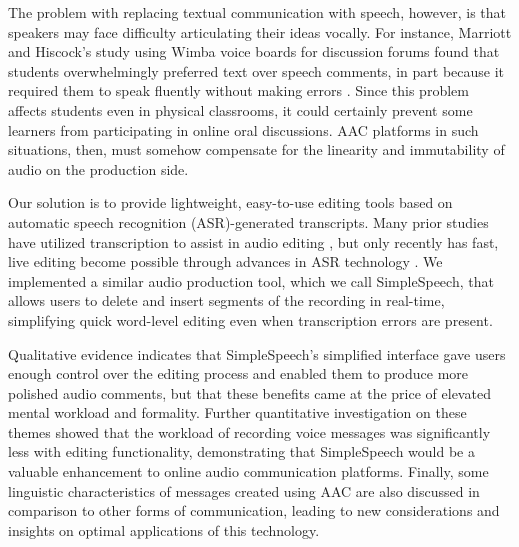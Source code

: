 The problem with replacing textual communication with speech, however, is that speakers may face difficulty articulating their ideas vocally.
For instance, Marriott and Hiscock's study using Wimba voice boards for discussion forums found that students overwhelmingly preferred text over speech comments, in part because it required them to speak fluently without making errors \cite{wimba}.
Since this problem affects students even in physical classrooms, it could certainly prevent some learners from participating in online oral discussions.
AAC platforms in such situations, then, must somehow compensate for the linearity and immutability of audio on the production side.

Our solution is to provide lightweight, easy-to-use editing tools based on automatic speech recognition (ASR)-generated transcripts.
Many prior studies have utilized transcription to assist in audio editing \cite{casares,rubin,whittaker_semantic}, but only recently has fast, live editing become possible through advances in ASR technology \cite{baker,saon}.
We implemented a similar audio production tool, which we call SimpleSpeech, that allows users to delete and insert segments of the recording in real-time, simplifying quick word-level editing even when transcription errors are present.

Qualitative evidence indicates that SimpleSpeech's simplified interface gave users enough control over the editing process and enabled them to produce more polished audio comments, but that these benefits came at the price of elevated mental workload and formality.
Further quantitative investigation on these themes showed that the workload of recording voice messages was significantly less with editing functionality, demonstrating that SimpleSpeech would be a valuable enhancement to online audio communication platforms.
Finally, some linguistic characteristics of messages created using AAC are also discussed in comparison to other forms of communication, leading to new considerations and insights on optimal applications of this technology.